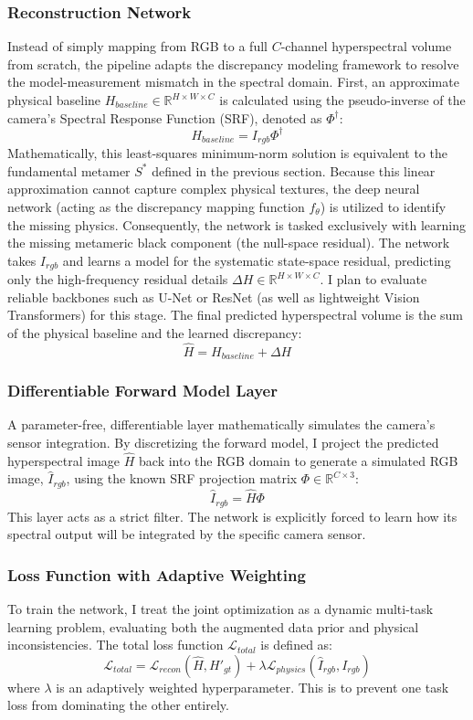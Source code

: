 \documentclass[stu]{apa7}
\begin{document}
\subsubsection{Reconstruction Network}
Instead of simply mapping from RGB to a full $C$-channel hyperspectral volume from scratch, the pipeline adapts the discrepancy modeling framework to resolve the model-measurement mismatch in the spectral domain. First, an approximate physical baseline $H_{baseline} \in \mathbb{R}^{H \times W \times C}$ is calculated using the pseudo-inverse of the camera's Spectral Response Function (SRF), denoted as $\Phi^{\dagger}$:
$$H_{baseline} = I_{rgb} \Phi^{\dagger}$$
Mathematically, this least-squares minimum-norm solution is equivalent to the fundamental metamer $S^*$ defined in the previous section. Because this linear approximation cannot capture complex physical textures, the deep neural network (acting as the discrepancy mapping function $f_\theta$) is utilized to identify the missing physics. Consequently, the network is tasked exclusively with learning the missing metameric black component (the null-space residual). The network takes $I_{rgb}$ and learns a model for the systematic state-space residual, predicting only the high-frequency residual details $\Delta H \in \mathbb{R}^{H \times W \times C}$. I plan to evaluate reliable backbones such as U-Net or ResNet (as well as lightweight Vision Transformers) for this stage. The final predicted hyperspectral volume is the sum of the physical baseline and the learned discrepancy:
$$\hat{H} = H_{baseline} + \Delta H$$

\subsubsection{Differentiable Forward Model Layer}
A parameter-free, differentiable layer mathematically simulates the camera's sensor integration. By discretizing the forward model, I project the predicted hyperspectral image $\hat{H}$ back into the RGB domain to generate a simulated RGB image, $\hat{I}_{rgb}$, using the known SRF projection matrix $\Phi \in \mathbb{R}^{C \times 3}$:
$$\hat{I}_{rgb} = \hat{H} \Phi$$
This layer acts as a strict filter. The network is explicitly forced to learn how its spectral output will be integrated by the specific camera sensor.

\subsubsection{Loss Function with Adaptive Weighting}
To train the network, I treat the joint optimization as a dynamic multi-task learning problem, evaluating both the augmented data prior and physical inconsistencies. The total loss function $\mathcal{L}_{total}$ is defined as:
$$\mathcal{L}_{total} = \mathcal{L}_{recon}(\hat{H}, H'_{gt}) + \lambda \mathcal{L}_{physics}(\hat{I}_{rgb}, I_{rgb})$$
where $\lambda$ is an adaptively weighted hyperparameter. This is to prevent one task loss from dominating the other entirely.
\end{document}
